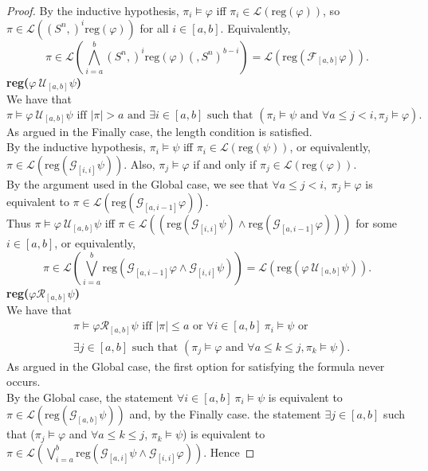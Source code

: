 \documentclass[runningheads]{llncs}
\renewcommand{\phi}{\varphi}
\begin{document}
\begin{proof}
 By the inductive hypothesis, $\pi_i \vDash \varphi$ iff $\pi_i \in \mathscr{L}(\text{reg}(\varphi))$, so $\pi \in \mathscr{L}((S^n,)^i \text{reg}(\varphi))$ for all $i \in [a,b]$. Equivalently, 
 $$\pi \in \mathscr{L}\left(\bigwedge_{i=a}^{b} (S^n,)^i \text{reg}(\phi)(,S^n)^{b-i}\right) = \mathscr{L}(\text{reg}(\mathcal{F}_{[a,b]}\varphi)).$$
 \noindent \textbf{reg($\varphi \ \mathcal{U}_{[a,b]} \psi$)}\\
  We have that 
  $$\pi \vDash \varphi \ \mathcal{U}_{[a,b]} \psi \text{ iff } |\pi| > a \text{ and } \exists i \in [a,b] \text{ such that } (\pi_i \vDash \psi \text{ and } \forall a \leq j < i, \pi_j \vDash \varphi).$$
  As argued in the Finally case, the length condition is satisfied.\\
  By the inductive hypothesis, $\pi_i \vDash \psi$ iff $\pi_i \in \mathscr{L}(\text{reg}(\psi))$, or equivalently, \\
  $\pi \in \mathscr{L}(\text{reg}(\mathcal{G}_{[i,i]} \psi))$. Also, $\pi_j \vDash \varphi$ if and only if $\pi_j \in \mathscr{L}(\text{reg}(\varphi))$.\\
  By the argument used in the Global case, we see that $\forall a \leq j < i, \ \pi_j \vDash \varphi$ is equivalent to $\pi \in \mathscr{L}(\text{reg}(\mathcal{G}_{[a, i-1]} \varphi))$.\\
  Thus $\pi \vDash \varphi \ \mathcal{U}_{[a,b]} \psi$ iff $\pi \in \mathscr{L}((\text{reg}(\mathcal{G}_{[i,i]} \psi) \land \text{reg}( \mathcal{G}_{[a, i-1]} \varphi)))$ for some $i \in [a,b]$, or equivalently, 
  $$\pi \in \mathscr{L}\left(\bigvee_{i=a}^{b} \text{reg}\left(\mathcal{G}_{[a,i-1]}\phi \land \mathcal{G}_{[i, i]} \psi\right)\right) = \mathscr{L}\left(\text{reg}(\varphi \ \mathcal{U}_{[a,b]} \psi)\right).$$
  \noindent \textbf{reg($\varphi \mathcal{R}_{[a,b]} \psi$)}\\
  We have that
  \begin{align*}
    &\pi \vDash \varphi \mathcal{R}_{[a,b]} \psi \text{ iff } |\pi| \leq a \text{ or } \forall i \in [a,b] \ \pi_i \vDash \psi \text{ or } \\ 
    &\exists j\in[a,b] \text{ such that }
    (\pi_j \vDash \varphi \text{ and } \forall a\leq k \leq j, \pi_k \vDash \psi).
  \end{align*}
  As argued in the Global case, the first option for satisfying the formula never occurs.\\
  By the Global case, the statement $\forall i\in[a,b] \ \pi_i \vDash \psi$ is equivalent to $\pi \in \mathscr{L}(\text{reg}(\mathcal{G}_{[a,b]} \psi))$ and, by the Finally case. the statement $\exists j\in[a,b]$ such that ($\pi_j \vDash \varphi$ and $\forall a\leq k \leq j$, $\pi_k \vDash \psi$) is equivalent to $\pi \in \mathscr{L}\left(\bigvee_{i=a}^{b} \text{reg}\left(\mathcal{G}_{[a,i]}\psi \land \mathcal{G}_{[i, i]} \phi\right)\right)$. Hence 

\end{proof}
\end{document}
